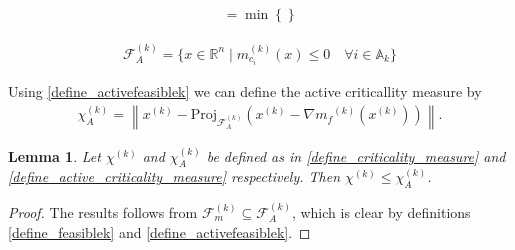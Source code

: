 \documentclass{article}
\newtheorem{lemma}[theorem]{Lemma}
\theoremstyle{case}
\numberwithin{theorem}{subsection}
\newcommand{\activeconstraintsk}{{\mathbb A_{k}}}
\newcommand{\chik}{{\chi^{(k)}}}
\newcommand{\feasiblek}{{\mathcal F_m^{(k)}}}
\newcommand{\mcik}{{{m}^{(k)}_{c_i}}}
\newcommand{\mfk}{{{m}_f}^{(k)}}
\newcommand{\Rn}{\mathbb R^n}
\newcommand{\xk}{x^{(k)}}
\newcommand{\activefeasiblek}{{\mathcal F^{(k)}_A}}
\newcommand{\activechik}{{\chi_A^{(k)}}}
\begin{document}
\begin{align*}
 = \min\left\{\right\}
\end{align*}
\color{black}



\begin{align}
\activefeasiblek = \{x \in \Rn \; | \; \mcik(x) \le 0 \quad \forall i \in \activeconstraintsk \} \label{define_activefeasiblek}
\end{align}

Using \cref{define_activefeasiblek} we can define the active criticallity measure by
\begin{align}
\activechik = \left\|\xk - \text{Proj}_{\activefeasiblek}\left(\xk- \nabla \mfk\left(\xk\right)\right)\right\| \label{define_active_criticality_measure}.
\end{align}


\begin{lemma}
Let $\chik$ and $\activechik$ be defined as in \cref{define_criticality_measure} and \cref{define_active_criticality_measure} respectively.
Then $\chik \le \activechik$.
\end{lemma}
\begin{proof}
The results follows from $\feasiblek \subseteq \activefeasiblek$, which is clear by definitions \cref{define_feasiblek} and \cref{define_activefeasiblek}.
\end{proof}
\end{document}
